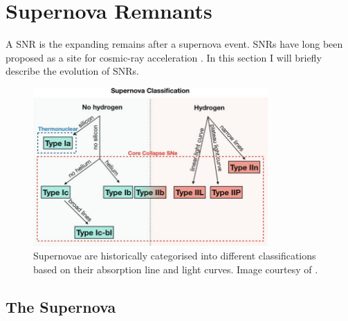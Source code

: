 \chapter{Supernova Remnants} \label{appendix:snrs}

A SNR is the expanding remains %
after a supernova event. SNRs have long been proposed as a site for cosmic-ray acceleration \citep{1934CoMtW...3...73B}. In this section I will briefly describe the evolution of SNRs.

\begin{figure}
    \centering
    \includegraphics[width=0.8\textwidth]{A1_Supernova_Remnants/Images/supernova_classification.pdf}
    \caption{Supernovae are historically categorised into different classifications based on their absorption line and light curves. Image courtesy of \cite{alma9928040781501811}.}
    \label{fig:A1_supernova_classification}
\end{figure}


\section{The Supernova}


